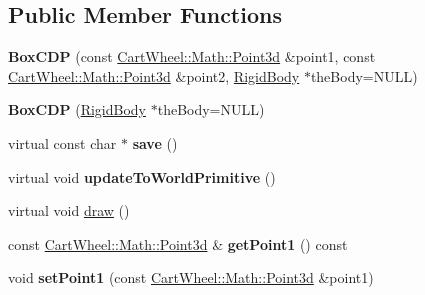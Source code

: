 \subsection*{Public Member Functions}
\begin{DoxyCompactItemize}
\item 
\hypertarget{classCartWheel_1_1Physics_1_1BoxCDP_adfb62bdc76f3f85380618c954cb92894}{
{\bfseries BoxCDP} (const \hyperlink{classCartWheel_1_1Math_1_1Point3d}{CartWheel::Math::Point3d} \&point1, const \hyperlink{classCartWheel_1_1Math_1_1Point3d}{CartWheel::Math::Point3d} \&point2, \hyperlink{classCartWheel_1_1Physics_1_1RigidBody}{RigidBody} $\ast$theBody=NULL)}
\label{classCartWheel_1_1Physics_1_1BoxCDP_adfb62bdc76f3f85380618c954cb92894}

\item 
\hypertarget{classCartWheel_1_1Physics_1_1BoxCDP_af7f901d83da49e5e3d77b1912a6611fb}{
{\bfseries BoxCDP} (\hyperlink{classCartWheel_1_1Physics_1_1RigidBody}{RigidBody} $\ast$theBody=NULL)}
\label{classCartWheel_1_1Physics_1_1BoxCDP_af7f901d83da49e5e3d77b1912a6611fb}

\item 
\hypertarget{classCartWheel_1_1Physics_1_1BoxCDP_ad338cfcbec94b96327377a05c1e0817f}{
virtual const char $\ast$ {\bfseries save} ()}
\label{classCartWheel_1_1Physics_1_1BoxCDP_ad338cfcbec94b96327377a05c1e0817f}

\item 
\hypertarget{classCartWheel_1_1Physics_1_1BoxCDP_a85d65e5e4331e66b4c655bc76971e4cc}{
virtual void {\bfseries updateToWorldPrimitive} ()}
\label{classCartWheel_1_1Physics_1_1BoxCDP_a85d65e5e4331e66b4c655bc76971e4cc}

\item 
virtual void \hyperlink{classCartWheel_1_1Physics_1_1BoxCDP_a30fe03a4419ba85988a0d909b42f9c3d}{draw} ()
\item 
\hypertarget{classCartWheel_1_1Physics_1_1BoxCDP_a015d274424967e56fd7f75c7e6759116}{
const \hyperlink{classCartWheel_1_1Math_1_1Point3d}{CartWheel::Math::Point3d} \& {\bfseries getPoint1} () const }
\label{classCartWheel_1_1Physics_1_1BoxCDP_a015d274424967e56fd7f75c7e6759116}

\item 
\hypertarget{classCartWheel_1_1Physics_1_1BoxCDP_ab45de378ebd1e7405ba554a5c42417d6}{
void {\bfseries setPoint1} (const \hyperlink{classCartWheel_1_1Math_1_1Point3d}{CartWheel::Math::Point3d} \&point1)}
\label{classCartWheel_1_1Physics_1_1BoxCDP_ab45de378ebd1e7405ba554a5c42417d6}


\end{DoxyCompactItemize}

